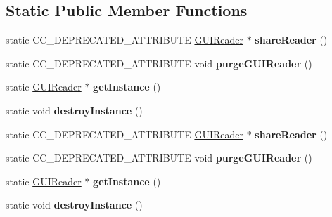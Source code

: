 \subsection*{Static Public Member Functions}
\begin{DoxyCompactItemize}
\item 
\mbox{\label{classcocostudio_1_1GUIReader_ac7507275837bfafa11c6ed03ac94a2e5}} 
static C\+C\+\_\+\+D\+E\+P\+R\+E\+C\+A\+T\+E\+D\+\_\+\+A\+T\+T\+R\+I\+B\+U\+TE \hyperlink{classcocostudio_1_1GUIReader}{G\+U\+I\+Reader} $\ast$ {\bfseries share\+Reader} ()
\item 
\mbox{\label{classcocostudio_1_1GUIReader_a87e99213ceee7a389b19bdd0b8946e9b}} 
static C\+C\+\_\+\+D\+E\+P\+R\+E\+C\+A\+T\+E\+D\+\_\+\+A\+T\+T\+R\+I\+B\+U\+TE void {\bfseries purge\+G\+U\+I\+Reader} ()
\item 
\mbox{\label{classcocostudio_1_1GUIReader_a05654c48d30da4ec616af2d0839238ba}} 
static \hyperlink{classcocostudio_1_1GUIReader}{G\+U\+I\+Reader} $\ast$ {\bfseries get\+Instance} ()
\item 
\mbox{\label{classcocostudio_1_1GUIReader_ac1fea3b7e18847cf89574259af0ac099}} 
static void {\bfseries destroy\+Instance} ()
\item 
\mbox{\label{classcocostudio_1_1GUIReader_ac7507275837bfafa11c6ed03ac94a2e5}} 
static C\+C\+\_\+\+D\+E\+P\+R\+E\+C\+A\+T\+E\+D\+\_\+\+A\+T\+T\+R\+I\+B\+U\+TE \hyperlink{classcocostudio_1_1GUIReader}{G\+U\+I\+Reader} $\ast$ {\bfseries share\+Reader} ()
\item 
\mbox{\label{classcocostudio_1_1GUIReader_a87e99213ceee7a389b19bdd0b8946e9b}} 
static C\+C\+\_\+\+D\+E\+P\+R\+E\+C\+A\+T\+E\+D\+\_\+\+A\+T\+T\+R\+I\+B\+U\+TE void {\bfseries purge\+G\+U\+I\+Reader} ()
\item 
\mbox{\label{classcocostudio_1_1GUIReader_ab11e7ed124059d6d0f5fb0784758b675}} 
static \hyperlink{classcocostudio_1_1GUIReader}{G\+U\+I\+Reader} $\ast$ {\bfseries get\+Instance} ()
\item 
\mbox{\label{classcocostudio_1_1GUIReader_a9d3925f68a11858b9d84492f23109592}} 
static void {\bfseries destroy\+Instance} ()
\end{DoxyCompactItemize}
